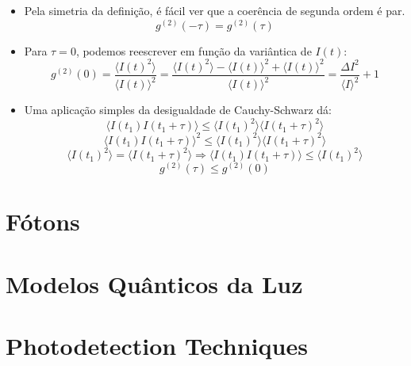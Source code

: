 \documentclass[12pt,a4paper]{report}
\begin{document}
\begin{itemize}
    \item Pela simetria da definição, é fácil ver que a coerência de segunda ordem é par.
    \begin{equation*}
        g^{(2)}(-\tau)=g^{(2)}(\tau)
    \end{equation*}
    \item Para $\tau=0$, podemos reescrever em função da variântica de $I(t)$:
    \begin{equation*}
        g^{(2)}(0)=\frac{\langle I(t)^2 \rangle}{\langle I(t) \rangle^2}=\frac{\langle I(t)^2 \rangle-\langle I(t) \rangle^2+\langle I(t) \rangle^2}{\langle I(t) \rangle^2}=\frac{\Delta I^2}{\langle I \rangle^2}+1
    \end{equation*}
    \item Uma aplicação simples da desigualdade de Cauchy-Schwarz dá:
    \begin{equation*}
        \langle I(t_1)I(t_1+\tau) \rangle \leq \langle I(t_1)^2 \rangle \langle I(t_1+\tau)^2 \rangle
    \end{equation*}
    \begin{equation*}
        \langle I(t_1)I(t_1+\tau) \rangle^2 \leq \langle I(t_1)^2 \rangle \langle I(t_1+\tau)^2 \rangle
    \end{equation*}
    \begin{equation*}
        \langle I(t_1)^2 \rangle = \langle I(t_1+\tau)^2 \rangle \Rightarrow \langle I(t_1)I(t_1+\tau) \rangle \leq \langle I(t_1)^2 \rangle
    \end{equation*}
    \begin{equation*}
        g^{(2)}(\tau)\leq g^{(2)}(0)
    \end{equation*}
\end{itemize}


\pagebreak

\section{Fótons}
\section{Modelos Quânticos da Luz}
\section{Photodetection Techniques}
\end{document}
